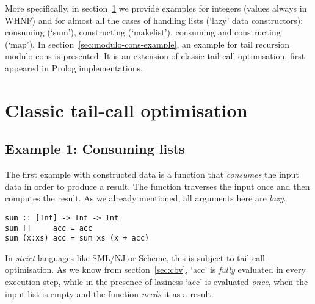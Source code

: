 \documentclass[diploma]{softlab-thesis}
\begin{document}
More specifically, in section~\ref{sec:classic-tco-examples} we provide examples for integers (values always in WHNF) and 
for almost all the cases of handling lists (`lazy' data constructors): 
consuming (`sum'), constructing (`makelist'), consuming and constructing (`map'). 
In section~\ref{sec:modulo-cons-example}, an example for tail recursion modulo cons is presented. It is an extension of classic 
tail-call optimisation, first appeared in Prolog implementations.


\section {Classic tail-call optimisation}
\label{sec:classic-tco-examples}





\subsection {Example 1: Consuming lists}
\label{sec:example1}

The first example with constructed data is a 
function that \textit{consumes} the input data in 
order to produce a result.  The function traverses 
the input once and then computes the result. As we 
already mentioned, all arguments here are \textit{lazy}.

\begin{verbatim}
sum :: [Int] -> Int -> Int
sum []     acc = acc
sum (x:xs) acc = sum xs (x + acc)
\end{verbatim}

In \textit{strict} languages like SML/NJ or Scheme,
this is subject to tail-call optimisation. As we know from section~\ref{sec:cbv},
`acc' is \textit{fully} evaluated in every execution step, while in the
presence of laziness `acc' is evaluated \textit{once}, when the input 
list is empty and the function \textit{needs} it as a result.
\end{document}
